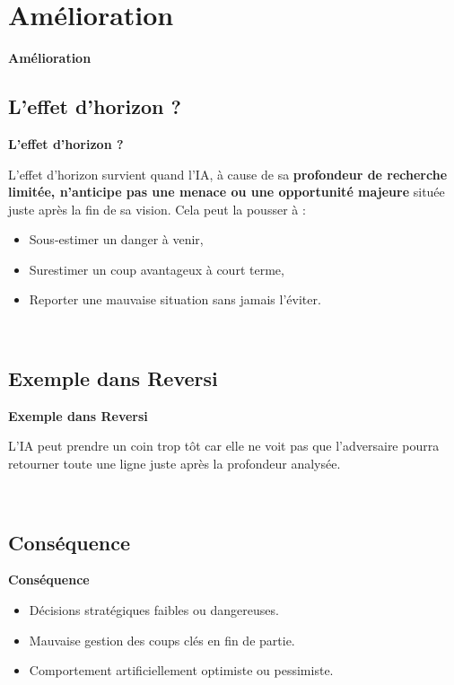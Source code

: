 \documentclass[9pt]{beamer}
\begin{document}
\section{Amélioration}
\begin{frame}
  \begin{center}
      \Large \textbf{Amélioration}
  \end{center}
\end{frame}

\begin{frame}
  \subsection{L'effet d'horizon ?}
  \textbf{L'effet d'horizon ?}

  L'effet d'horizon survient quand l'IA, à cause de sa \textbf{profondeur de recherche limitée, n'anticipe pas une menace ou une opportunité majeure} située juste après la fin de sa vision. Cela peut la pousser à :
  \begin{itemize}
    \item Sous-estimer un danger à venir,
    \item Surestimer un coup avantageux à court terme,
    \item Reporter une mauvaise situation sans jamais l'éviter.
  \end{itemize}

  ~

  \subsection{Exemple dans Reversi}
  \textbf{Exemple dans Reversi}

  L’IA peut prendre un coin trop tôt car elle ne voit pas que l’adversaire pourra retourner toute une ligne juste après la profondeur analysée.

  ~

  \subsection{Conséquence}
  \textbf{Conséquence}
  \begin{itemize}
    \item Décisions stratégiques faibles ou dangereuses.
    \item Mauvaise gestion des coups clés en fin de partie.
    \item Comportement artificiellement optimiste ou pessimiste.
  \end{itemize}


\end{frame}
\end{document}
